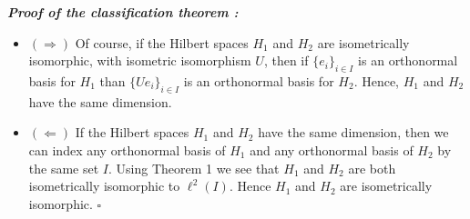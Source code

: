\documentclass[12pt]{article}
\begin{document}
$\,$

{\bf \emph{Proof of the classification theorem :}}
\begin{itemize}
\item $(\Longrightarrow)$ Of course, if the Hilbert spaces $H_1$ and $H_2$ are isometrically isomorphic, with isometric isomorphism $U$, then if $\{e_i\}_{i \in I}$ is an orthonormal basis for $H_1$ than $\{Ue_i\}_{i \in I}$ is an orthonormal basis for $H_2$. Hence, $H_1$ and $H_2$ have the same dimension.
\end{itemize}
\begin{itemize}
\item $(\Longleftarrow)$ If the Hilbert spaces $H_1$ and $H_2$ have the same dimension, then we can index any orthonormal basis of $H_1$ and any orthonormal basis of $H_2$ by the same set $I$. Using Theorem 1 we see that $H_1$ and $H_2$ are both isometrically isomorphic to $\ell^2(I)$. Hence $H_1$ and $H_2$ are isometrically isomorphic. $\square$
\end{itemize}
\end{document}
